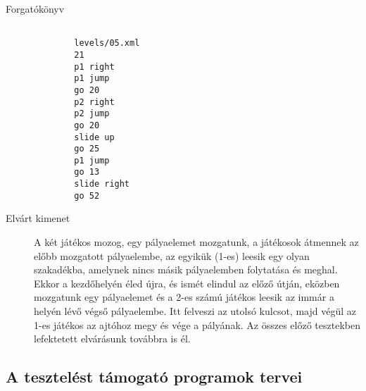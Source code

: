 \begin{description}
	\item[Forgatókönyv]
	\begin{verbatim}

		levels/05.xml
		21
		p1 right
		p1 jump
		go 20
		p2 right
		p2 jump
		go 20
		slide up
		go 25
		p1 jump
		go 13
		slide right
		go 52
	\end{verbatim}
	
	\item[Elvárt kimenet] A két játékos mozog, egy pályaelemet mozgatunk, a játékosok átmennek az előbb mozgatott pályaelembe, az egyikük (1-es) leesik egy olyan szakadékba, amelynek nincs másik pályaelemben folytatása és meghal. Ekkor a kezdőhelyén éled újra, és ismét elindul az előző útján, eközben mozgatunk egy pályaelemet és a 2-es számú játékos leesik az immár a helyén lévő végső pályaelembe. Itt felveszi az utolsó kulcsot, majd végül az 1-es játékos az ajtóhoz megy és vége a pályának. Az összes előző tesztekben lefektetett elvárásunk továbbra is él.
	
\end{description}

\newpage


\subsection{A tesztelést támogató programok tervei}

